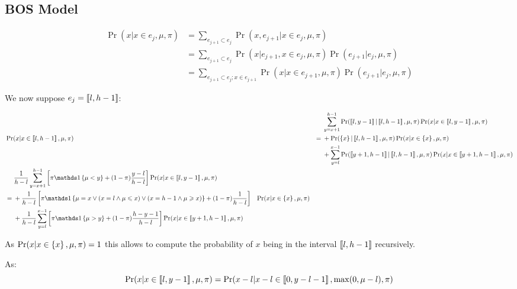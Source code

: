 \subsection{BOS Model}

\begin{align}
    \Pr(x | x \in e_j, \mu, \pi) 
    &= \sum_{e_{j+1} \subset e_j} \Pr(x, e_{j+1} | x \in e_j, \mu, \pi) \\
    &= \sum_{e_{j+1} \subset e_j} \Pr(x | e_{j+1}, x \in e_j, \mu, \pi) \Pr(e_{j+1} | e_j, \mu, \pi) \\
    &= \sum_{e_{j+1} \subset e_j ; x\in e_{j+1}} \Pr(x | x \in e_{j+1}, \mu, \pi) \Pr(e_{j+1} | e_j, \mu, \pi)
\end{align}

We now suppose $e_j = \left\llbracket l, h - 1\right\rrbracket$:

\begin{align}
    &\Pr(x | x \in \bbrack{l, h-1}, \mu, \pi)
    &= \begin{aligned}
        &\sum_{y=x + 1}^{h-1} \Pr(\bbrack{l, y - 1} | \bbrack{l, h-1}, \mu, \pi) \Pr(x | x \in \bbrack{l, y - 1}, \mu, \pi) \\
        &+ \Pr(\set{x} | \bbrack{l, h-1}, \mu, \pi) \Pr(x | x \in \set{x}, \mu, \pi) \\
        &+ \sum_{y=l}^{x - 1} \Pr(\bbrack{y + 1, h-1} | \bbrack{l, h-1}, \mu, \pi) \Pr(x | x \in \bbrack{y + 1, h-1}, \mu, \pi)
    \end{aligned} \\
    &= \begin{aligned}
        &\frac{1}{h - l} \sum_{y=x + 1}^{h-1} \left[ \pi \indickronecker{\mu < y} + (1-\pi) \frac{y - l}{h - l} \right] \Pr(x | x \in \bbrack{l, y - 1}, \mu, \pi) \\
        &+\frac{1}{h - l} \left[ \pi \indickronecker{\mu = x \lor (x = l \land \mu \leq x) \lor (x = h - 1 \land \mu \geq x)} + (1 - \pi) \frac{1}{h-l} \right] 
        &\Pr(x | x \in \set{x}, \mu, \pi) \\
        &+\frac{1}{h - l} \sum_{y=l}^{x - 1} \left[ \pi \indickronecker{\mu > y} + (1-\pi) \frac{h - y - 1}{h - l} \right] \Pr(x | x \in \bbrack{y + 1, h-1}, \mu, \pi)
    \end{aligned}
\end{align}

As $\Pr(x | x \in \left\{ x \right\}, \mu, \pi) = 1$ this allows to compute the probability of $x$ being in the interval $\left\llbracket l, h-1\right\rrbracket$ recursively.

As:
\begin{equation}
    \Pr(x | x \in \left\llbracket l, y - 1\right\rrbracket, \mu, \pi) = \Pr(x - l | x - l \in \left\llbracket0, y - l - 1\right\rrbracket, \max(0, \mu - l), \pi)
\end{equation}

